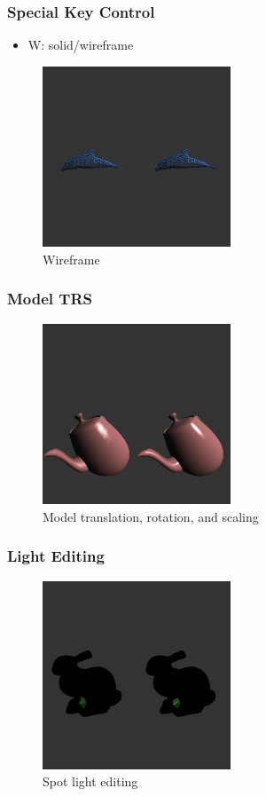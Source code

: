 \documentclass{beamer}
\begin{document}
\begin{frame}
  \frametitle{Special Key Control}
  \begin{itemize}
    \item W: solid/wireframe
  \end{itemize}
  \begin{figure}
    \includegraphics[width=0.5\textwidth]{wireframe}
    \caption{Wireframe}
  \end{figure}
\end{frame}

\begin{frame}
  \frametitle{Model TRS}
  \begin{figure}
    \includegraphics[width=0.5\textwidth]{model_trs}
    \caption{Model translation, rotation, and scaling}
  \end{figure}
\end{frame}

\begin{frame}
  \frametitle{Light Editing}
  \begin{figure}
    \includegraphics[width=0.5\textwidth]{light_edit}
    \caption{Spot light editing}
  \end{figure}
\end{frame}
\end{document}

